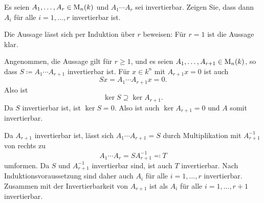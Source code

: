 \begin{question}
 Es seien $A_1, \dotsc, A_r \in \operatorname{M}_n(k)$ und $A_1 \dotsm A_r$ sei invertierbar. Zeigen Sie, dass dann $A_i$ für alle $i=1, \dotsc, r$ invertierbar ist.
\end{question}
\begin{solution}
 Die Aussage lässt sich per Induktion über $r$ beweisen: Für $r = 1$ ist die Aussage klar.
 
 Angenommen, die Aussage gilt für $r \geq 1$, und es seien $A_1, \dotsc, A_{r+1} \in \operatorname{M}_n(k)$, so dass $S \coloneqq A_1 \dotsm A_{r+1}$ invertierbar ist. Für $x \in k^n$ mit $A_{r+1} x = 0$ ist auch
 \[
  S x = A_1 \dotsm A_{r+1} x = 0.
 \]
 Also ist
 \[
  \ker S \supseteq \ker A_{r+1}.
 \]
 Da $S$ invertierbar ist, ist $\ker S = 0$. Also ist auch $\ker A_{r+1} = 0$ und $A$ somit invertierbar.
 
 Da $A_{r+1}$ invertierbar ist, lässt sich $A_1 \dotsm A_{r+1} = S$ durch Multiplikation mit $A_{r+1}^{-1}$ von rechts zu
 \[
  A_1 \dotsm A_r = S A_{r+1}^{-1} \eqqcolon T
 \]
 umformen. Da $S$ und $A_{r+1}^{-1}$ invertierbar sind, ist auch $T$ invertierbar. Nach Induktionsvoraussetzung sind daher auch $A_i$ für alle $i = 1, \dotsc, r$ invertierbar. Zusammen mit der Invertierbarkeit von $A_{r+1}$ ist als $A_i$ für alle $i = 1, \dotsc, r+1$ invertierbar.
\end{solution}


